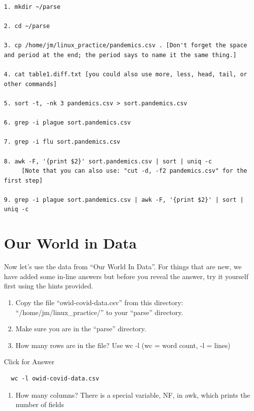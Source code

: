\documentclass[
]{book}
\providecommand{\tightlist}{%
  \setlength{\itemsep}{0pt}\setlength{\parskip}{0pt}}
\begin{document}
\begin{verbatim}
1. mkdir ~/parse

2. cd ~/parse

3. cp /home/jm/linux_practice/pandemics.csv . [Don't forget the space and period at the end; the period says to name it the same thing.]

4. cat table1.diff.txt [you could also use more, less, head, tail, or other commands]

5. sort -t, -nk 3 pandemics.csv > sort.pandemics.csv

6. grep -i plague sort.pandemics.csv

7. grep -i flu sort.pandemics.csv

8. awk -F, '{print $2}' sort.pandemics.csv | sort | uniq -c
     [Note that you can also use: "cut -d, -f2 pandemics.csv" for the first step]

9. grep -i plague sort.pandemics.csv | awk -F, '{print $2}' | sort | uniq -c
\end{verbatim}

\hypertarget{our-world-in-data}{%
\section{Our World in Data}\label{our-world-in-data}}

Now let's use the data from ``Our World In Data''. For things that are new, we have added some in-line answers but before you reveal the answer, try it yourself first using the hints provided.

\begin{enumerate}
\def\labelenumi{\arabic{enumi}.}
\setcounter{enumi}{9}
\item
  Copy the file ``owid-covid-data.csv'' from this directory: ``/home/jm/linux\_practice/'' to your ``parse'' directory.
\item
  Make sure you are in the ``parse'' directory.
\item
  How many rows are in the file? Use wc -l (wc = word count, -l = lines)
\end{enumerate}

Click for Answer

\begin{verbatim}
  wc -l owid-covid-data.csv
\end{verbatim}

\hfill\break

\begin{enumerate}
\def\labelenumi{\arabic{enumi}.}
\setcounter{enumi}{12}
\tightlist
\item
  How many columns? There is a special variable, NF, in awk, which prints the number of fields
\end{enumerate}
\end{document}
